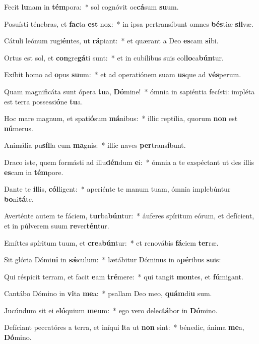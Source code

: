\item Fecit \textbf{lu}nam in \textbf{tém}pora:~* sol cognóvit oc\textbf{cá}sum \textbf{su}um.
\item Posuísti ténebras, et \textbf{fac}ta \textbf{est} nox:~* in ipsa pertransíbunt omnes \textbf{bés}tiæ \textbf{sil}væ.
\item Cátuli leónum rugi\textbf{én}tes, ut \textbf{rá}piant:~* et quærant a Deo \textbf{es}cam \textbf{si}bi.
\item Ortus est sol, et \textbf{con}gre\textbf{gá}ti sunt:~* et in cubílibus suis col\textbf{lo}ca\textbf{bún}tur.
\item Exíbit homo ad \textbf{o}pus \textbf{su}um:~* et ad operatiónem suam \textbf{us}que ad \textbf{vés}perum.
\item Quam magnificáta sunt ópera \textbf{tu}a, \textbf{Dó}mine!~* ómnia in sapiéntia fecísti: impléta est terra possessi\textbf{ó}ne \textbf{tu}a.
\item Hoc mare magnum, et spati\textbf{ó}sum \textbf{má}nibus:~* illic reptília, quorum \textbf{non} est \textbf{nú}merus.
\item Animália pu\textbf{síl}la cum \textbf{ma}gnis:~* illic naves \textbf{per}trans\textbf{í}bunt.
\item Draco iste, quem formásti ad illu\textbf{dén}dum \textbf{e}i:~* ómnia a te exspéctant ut des illis \textbf{es}cam in \textbf{tém}pore.
\item Dante te \textbf{il}lis, \textbf{cól}ligent:~* aperiénte te manum tuam, ómnia implebúntur \textbf{bo}ni\textbf{tá}te.
\item Averténte autem te fáciem, \textbf{tur}ba\textbf{bún}tur:~* áuferes spíritum eórum, et defícient, et in púlverem suum \textbf{re}ver\textbf{tén}tur.
\item Emíttes spíritum tuum, et \textbf{cre}a\textbf{bún}tur:~* et renovábis \textbf{fá}ciem \textbf{ter}ræ.
\item Sit glória Dómi\textbf{ni} in \textbf{sǽ}culum:~* lætábitur Dóminus in o\textbf{pé}ribus \textbf{su}is:
\item Qui réspicit terram, et facit \textbf{e}am \textbf{tré}mere:~* qui tangit \textbf{mon}tes, et \textbf{fú}migant.
\item Cantábo Dómino in \textbf{vi}ta \textbf{me}a:~* psallam Deo meo, \textbf{quám}di\textbf{u} sum.
\item Jucúndum sit ei e\textbf{ló}quium \textbf{me}um:~* ego vero delec\textbf{tá}bor in \textbf{Dó}mino.
\item Defíciant peccatóres a terra, et iníqui \textbf{i}ta ut \textbf{non} sint:~* bénedic, ánima \textbf{me}a, \textbf{Dó}mino.
